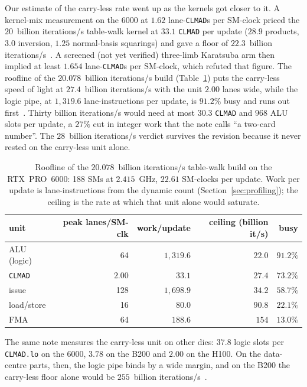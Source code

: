 Our estimate of the carry-less rate went up as the kernels got closer
to it. A kernel-mix measurement on the 6000 at $1.62$
lane-\texttt{CLMAD}s per SM-clock priced the $20$~billion iterations/s table-walk kernel
at $33.1$ \texttt{CLMAD} per update ($28.9$ products, $3.0$ inversion,
$1.25$ normal-basis squarings) and gave a floor of
$22.3$~billion iterations/s~. A screened (not yet
verified) three-limb Karatsuba arm then implied at least $1.654$
lane-\texttt{CLMAD}s per SM-clock, which refuted that figure. The
roofline of the $20.078$~billion iterations/s build (Table~\ref{tab:roofline}) puts the
carry-less speed of light at $27.4$~billion iterations/s with the unit $2.00$ lanes
wide, while the logic pipe, at $1{,}319.6$ lane-instructions per
update, is $91.2\%$ busy and runs out first~.
Thirty billion iterations/s would need at most $30.3$ \texttt{CLMAD} and $968$ ALU slots
per update, a $27\%$ cut in integer work that the note calls ``a
two-card number''. The $28$~billion iterations/s verdict survives the revision because
it never rested on the carry-less unit alone.

\begin{table}[t]
\centering
\small
\caption{Roofline of the $20.078$~billion iterations/s table-walk build on the
  RTX~PRO~6000: 188 SMs at $2.415$~GHz, $22.61$ SM-clocks per update.
  Work per update is lane-instructions from the dynamic count (Section~\ref{sec:profiling}); the ceiling is the
  rate at which that unit alone would saturate.}
\label{tab:roofline}
\begin{tabular}{@{}lrrrr@{}}
\toprule
unit & peak lanes/SM-clk & work/update & ceiling (billion it/s) & busy \\
\midrule
ALU (logic) & 64 & $1{,}319.6$ & $22.0$ & $91.2\%$ \\
\texttt{CLMAD} & $2.00$ & $33.1$ & $27.4$ & $73.2\%$ \\
issue & 128 & $1{,}698.9$ & $34.2$ & $58.7\%$ \\
load/store & 16 & $80.0$ & $90.8$ & $22.1\%$ \\
FMA & 64 & $188.6$ & $154$ & $13.0\%$ \\
\bottomrule
\end{tabular}
\end{table}



The same note measures the carry-less unit on other dies: $37.8$
logic slots per \texttt{CLMAD.lo} on the 6000, $3.78$ on the B200 and
$2.00$ on the H100. On the data-centre parts, then, the logic pipe
binds by a wide margin, and on the B200 the carry-less floor alone
would be $255$~billion iterations/s~.

